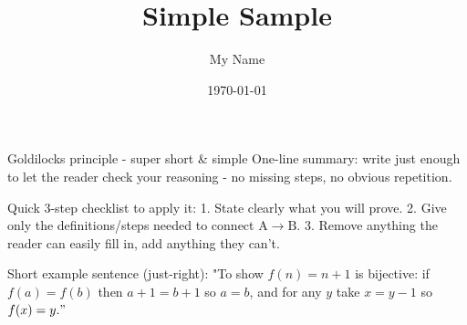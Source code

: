 \documentclass{article} %
\title{Simple Sample} %
\author{My Name} %
\date{\today} %
\begin{document}
  \maketitle %
  



  \newpage


 
  Goldilocks principle - super short \& simple
  One-line summary: write just enough to let the reader check your reasoning - no missing steps, no obvious repetition.

  Quick 3-step checklist to apply it:
  1. State clearly what you will prove.
  2. Give only the definitions/steps needed to connect $\mathrm{A} \rightarrow \mathrm{B}$.
  3. Remove anything the reader can easily fill in, add anything they can't.

  Short example sentence (just-right):
  "To show $f(n)=n+1$ is bijective: if $f(a)=f(b)$ then $a+1=b+1$ so $a=b$, and for any $y$ take $x=y-1$ so $f(x)=y . "$
\end{document}
